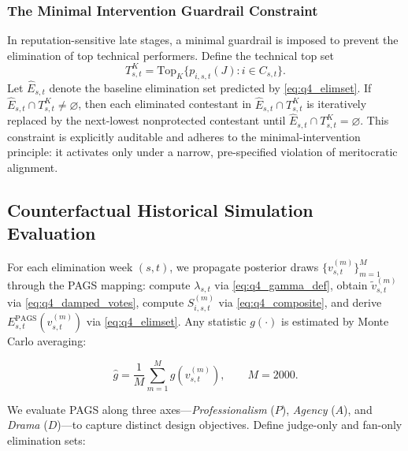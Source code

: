 \subsubsection{The Minimal Intervention Guardrail Constraint }
\label{sec:q4_guardrail}

In reputation-sensitive late stages, a minimal guardrail is imposed to prevent the elimination of top technical performers. Define the technical top set
\begin{equation}
T_{s,t}^{K}
=
\mathrm{Top}_{K}\{p_{i,s,t}(J): i\in C_{s,t}\}.
\label{eq:q4_topk}
\end{equation}
Let $\hat E_{s,t}$ denote the baseline elimination set predicted by \eqref{eq:q4_elimset}. If $\hat E_{s,t}\cap T_{s,t}^{K}\neq\varnothing$, then each eliminated contestant in $\hat E_{s,t}\cap T_{s,t}^{K}$ is iteratively replaced by the next-lowest nonprotected contestant until $\hat E_{s,t}\cap T_{s,t}^{K}=\varnothing$. This constraint is explicitly auditable and adheres to the minimal-intervention principle: it activates only under a narrow, pre-specified violation of meritocratic alignment.

\subsection{Counterfactual Historical Simulation Evaluation }
\label{sec:q4_eval}

For each elimination week $(s,t)$, we propagate posterior draws $\{v^{(m)}_{s,t}\}_{m=1}^{M}$ through the PAGS mapping: compute $\lambda_{s,t}$ via \eqref{eq:q4_gamma_def}, obtain $\tilde v^{(m)}_{s,t}$ via \eqref{eq:q4_damped_votes}, compute $S^{(m)}_{i,s,t}$ via \eqref{eq:q4_composite}, and derive $E_{s,t}^{\mathrm{PAGS}}(v^{(m)}_{s,t})$ via \eqref{eq:q4_elimset}. Any statistic $g(\cdot)$ is estimated by Monte Carlo averaging:

\begin{equation}
\widehat g
=
\frac{1}{M}\sum_{m=1}^{M}
g\!\left(v^{(m)}_{s,t}\right),
\qquad M=2000.
\label{eq:q4_mc}
\end{equation}

We evaluate PAGS along three axes—\emph{Professionalism} ($P$), \emph{Agency} ($A$), and \emph{Drama} ($D$)—to capture distinct design objectives. Define judge-only and fan-only elimination sets:

